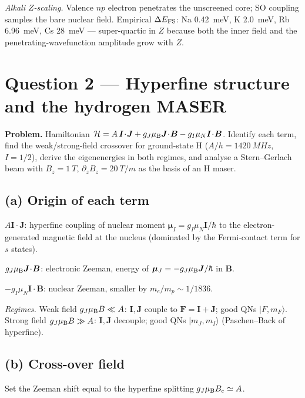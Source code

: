 \documentclass[11pt]{article}
\begin{document}
\textit{Alkali $Z$-scaling.} Valence $np$ electron penetrates the unscreened core; SO coupling samples the bare nuclear field. Empirical $\Delta E_{\rm FS}$: Na \SI{0.42}{meV}, K \SI{2.0}{meV}, Rb \SI{6.96}{meV}, Cs \SI{28}{meV} — super-quartic in $Z$ because both the inner field and the penetrating-wavefunction amplitude grow with $Z$.

\section*{Question 2 --- Hyperfine structure and the hydrogen MASER}

\textbf{Problem.} Hamiltonian $\mathcal H=A\,\bm I\!\cdot\!\bm J+g_J\mu_{\rm B}\bm J\!\cdot\!\bm B-g_I\mu_N\bm I\!\cdot\!\bm B$. Identify each term, find the weak/strong-field crossover for ground-state H ($A/h=\SI{1420}{MHz}$, $I=1/2$), derive the eigenenergies in both regimes, and analyse a Stern--Gerlach beam with $B_z=\SI{1}{T}$, $\partial_z B_z=\SI{20}{T/m}$ as the basis of an H maser.

\subsection*{(a) Origin of each term}

$A\bm I\!\cdot\!\bm J$: hyperfine coupling of nuclear moment $\bm\mu_I=g_I\mu_N\bm I/\hbar$ to the electron-generated magnetic field at the nucleus (dominated by the Fermi-contact term for $s$ states).

$g_J\mu_{\rm B}\bm J\!\cdot\!\bm B$: electronic Zeeman, energy of $\bm\mu_J=-g_J\mu_{\rm B}\bm J/\hbar$ in $\bm B$.

$-g_I\mu_N\bm I\!\cdot\!\bm B$: nuclear Zeeman, smaller by $m_e/m_p\sim 1/1836$.

\textit{Regimes.} Weak field $g_J\mu_{\rm B}B\ll A$: $\bm I,\bm J$ couple to $\bm F=\bm I+\bm J$; good QNs $|F,m_F\rangle$. Strong field $g_J\mu_{\rm B}B\gg A$: $\bm I,\bm J$ decouple; good QNs $|m_J,m_I\rangle$ (Paschen--Back of hyperfine).

\subsection*{(b) Cross-over field}

Set the Zeeman shift equal to the hyperfine splitting $g_J\mu_{\rm B}B_c\simeq A$.
\end{document}
